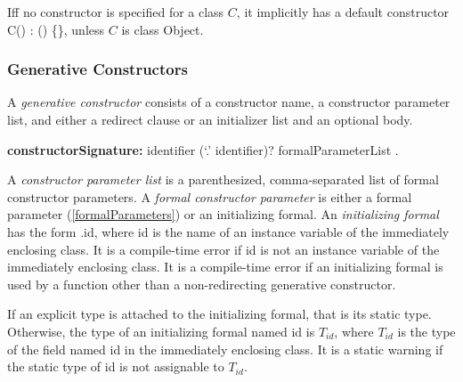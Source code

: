\documentclass{article}
\newcommand{\code}[1]{{\sf #1}}
\begin{document}


\LMHash{}
Iff no constructor is specified for a class $C$, it implicitly has a default constructor \code{C() : \SUPER{}() \{\}}, unless $C$ is class \code{Object}.

\subsubsection{Generative Constructors}

\LMHash{}
A {\em generative constructor} consists of a constructor name, a constructor parameter list, and either a redirect clause or an  initializer list and an optional body.

\begin{grammar}
{\bf constructorSignature:}
      identifier (`{\escapegrammar .}' identifier)? formalParameterList
    .
 \end{grammar}

\LMHash{}
A {\em constructor parameter list} is a parenthesized, comma-separated list of formal constructor parameters. A {\em formal constructor parameter} is either a formal parameter (\ref{formalParameters}) or an initializing formal. An {\em initializing formal} has the form \code{\THIS{}.id}, where \code{id} is the name of an instance variable of the immediately enclosing class.  It is a compile-time error if \code{id} is not an instance variable of the immediately enclosing class. It is a compile-time error if an initializing formal is used by a function other than a non-redirecting generative constructor.

\LMHash{}
If an explicit type is attached to the initializing formal, that is its static type. Otherwise, the type of an initializing formal named \code{id} is $T_{id}$, where $T_{id}$ is the type of the field named \code{id} in the immediately enclosing class. It is a static warning if the static type of \code{id} is not assignable to $T_{id}$.
\end{document}
